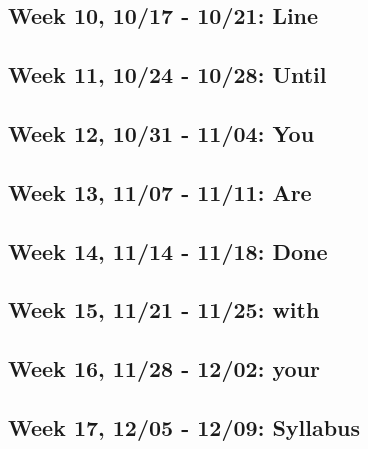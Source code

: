 \documentclass[11pt,]{article}
\begin{document}
\hypertarget{week-10-1017---1021-line}{%
\subsection{Week 10, 10/17 - 10/21: Line}\label{week-10-1017---1021-line}}

\hypertarget{week-11-1024---1028-until}{%
\subsection{Week 11, 10/24 - 10/28: Until}\label{week-11-1024---1028-until}}

\hypertarget{week-12-1031---1104-you}{%
\subsection{Week 12, 10/31 - 11/04: You}\label{week-12-1031---1104-you}}

\hypertarget{week-13-1107---1111-are}{%
\subsection{Week 13, 11/07 - 11/11: Are}\label{week-13-1107---1111-are}}

\hypertarget{week-14-1114---1118-done}{%
\subsection{Week 14, 11/14 - 11/18: Done}\label{week-14-1114---1118-done}}

\hypertarget{week-15-1121---1125-with}{%
\subsection{Week 15, 11/21 - 11/25: with}\label{week-15-1121---1125-with}}

\hypertarget{week-16-1128---1202-your}{%
\subsection{Week 16, 11/28 - 12/02: your}\label{week-16-1128---1202-your}}

\hypertarget{week-17-1205---1209-syllabus}{%
\subsection{Week 17, 12/05 - 12/09: Syllabus}\label{week-17-1205---1209-syllabus}}
\end{document}
